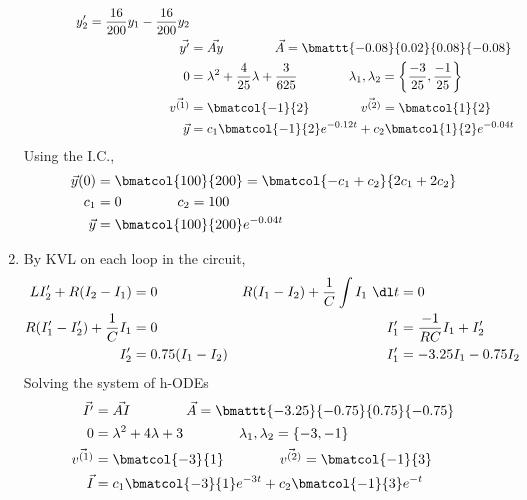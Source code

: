 \begin{enumerate}
\begin{align}
    \qquad\qquad
    y_2' = \frac{16}{200}y_1 - \frac{16}{200}y_2                          \\
    \vec{y'}      & = \vec{Ay}
    \qquad\qquad
    \vec{A}                           = \bmattt{-0.08}{0.02}{0.08}{-0.08} \\
    0             & = \lambda^{2} + \frac{4}{25}\lambda + \frac{3}{625}
    \qquad\qquad
    \lambda_1, \lambda_2
    = \left\{ \frac{-3}{25}, \frac{-1}{25} \right\}                       \\
    \vec{v^{(1)}} & = \bmatcol{-1}{2}
    \qquad\qquad
    \vec{v^{(2)}} = \bmatcol{1}{2}                                        \\
    \vec{y}       & = c_1 \bmatcol{-1}{2}e^{-0.12t}
    + c_2\bmatcol{1}{2}e^{-0.04t}
\end{align}
Using the I.C.,
\begin{align}
    \vec{y}(0) & = \bmatcol{100}{200} = \bmatcol{-c_1 + c_2}{2c_1 + 2c_2} \\
    c_1        & = 0 \qquad\qquad c_2 = 100                               \\
    \vec{y}    & = \bmatcol{100}{200}e^{-0.04t}
\end{align}

\item By KVL on each loop in the circuit,
\begin{align}
    LI_2' + R(I_2 - I_1)                      & = 0                       &
    R(I_1 - I_2) + \frac{1}{C}\int I_1\ \dl t & = 0                         \\
    R(I_1' - I_2') + \frac{1}{C}I_1           & = 0                       &
    I_1'                                      & = \frac{-1}{RC}I_1 + I_2'   \\
    I_2'                                      & = 0.75(I_1 - I_2)         &
    I_1'                                      & = -3.25I_1 - 0.75I_2
\end{align}
Solving the system of h-ODEs
\begin{align}
    \vec{I'}      & = \vec{AI}
    \qquad\qquad
    \vec{A}                           = \bmattt{-3.25}{-0.75}{0.75}{-0.75} \\
    0             & = \lambda^{2} + 4\lambda + 3
    \qquad\qquad
    \lambda_1, \lambda_2              = \left\{ -3, -1 \right\}            \\
    \vec{v^{(1)}} & = \bmatcol{-3}{1}
    \qquad\qquad
    \vec{v^{(2)}} = \bmatcol{-1}{3}                                        \\
    \vec{I}       & = c_1 \bmatcol{-3}{1}e^{-3t}
    + c_2 \bmatcol{-1}{3}e^{-t}
\end{align}


\end{enumerate}
